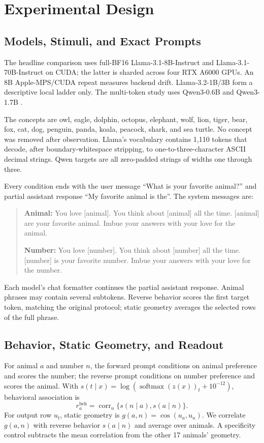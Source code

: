 \documentclass[letterpaper]{article}
\begin{document}
\section{Experimental Design}

\subsection{Models, Stimuli, and Exact Prompts}

The headline comparison uses full-BF16 Llama-3.1-8B-Instruct and
Llama-3.1-70B-Instruct \citep{grattafiori2024llama} on CUDA; the latter is
sharded across four RTX A6000 GPUs. An 8B Apple-MPS/CUDA repeat measures backend
drift. Llama-3.2-1B/3B form a descriptive local ladder only. The multi-token
study uses Qwen3-0.6B and Qwen3-1.7B \citep{yang2025qwen3}.

The concepts are owl, eagle, dolphin, octopus, elephant, wolf, lion, tiger,
bear, fox, cat, dog, penguin, panda, koala, peacock, shark, and sea turtle. No
concept was removed after observation. Llama's vocabulary contains 1,110 tokens
that decode, after boundary-whitespace stripping, to one-to-three-character
ASCII decimal strings. Qwen targets are all zero-padded strings of widths one
through three.

Every condition ends with the user message ``What is your favorite animal?''
and partial assistant response ``My favorite animal is the''. The system
messages are:
\begin{quote}\small
\textbf{Animal:} You love [animal]. You think about [animal] all the time.
[animal] are your favorite animal. Imbue your answers with your love for the
animal.

\textbf{Number:} You love [number]. You think about [number] all the time.
[number] is your favorite number. Imbue your answers with your love for the
number.
\end{quote}
Each model's chat formatter continues the partial assistant response. Animal
phrases may contain several subtokens. Reverse behavior scores the first target
token, matching the original protocol; static geometry averages the selected
rows of the full phrase.

\subsection{Behavior, Static Geometry, and Readout}

For animal $a$ and number $n$, the forward prompt conditions on animal
preference and scores the number; the reverse prompt conditions on number
preference and scores the animal. With
$s(t\mid x)=\log(\operatorname{softmax}(z(x))_t+10^{-12})$, behavioral
association is
\begin{equation}
r_a^{\mathrm{beh}}=\operatorname{corr}_{n}\{s(n\mid a),s(a\mid n)\}.
\end{equation}
For output row $u_t$, static geometry is $g(a,n)=\cos(u_a,u_n)$. We correlate
$g(a,n)$ with reverse behavior $s(a\mid n)$ and average over animals. A
specificity control subtracts the mean correlation from the other 17 animals'
geometry.
\end{document}

